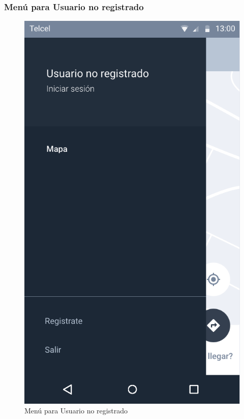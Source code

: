 \subsubsection{Menú para Usuario no registrado}\label{Menu-Usuario}
\begin{figure}[H]
	\centering
	\includegraphics[scale=.55]{Capitulo4/software/submodulos/images/menu-usuario-no-registrado}
	\caption{Menú para Usuario no registrado}
	\label{fig:menu-usuario}
\end{figure}

